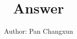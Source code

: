 \documentclass[12pt,a4paper]{article}
\title{\textbf{Answer}}
\author{Author: Pan Changxun}
\date{}
\begin{document}
\maketitle
\footnotesize








\end{document}
